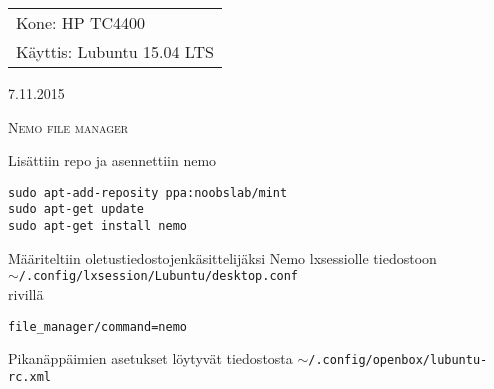 \documentclass[main.tex]{subfiles}
\begin{document}
\thispagestyle{empty}
\begin{tabular}[t]{l}
Kone: HP TC4400\\
Käyttis: Lubuntu 15.04 LTS
\end{tabular}
\hfill 7.11.2015

{\scshape\Large{Nemo file manager}}

Lisättiin repo ja asennettiin nemo

\begin{lstlisting}
sudo apt-add-reposity ppa:noobslab/mint
sudo apt-get update
sudo apt-get install nemo
\end{lstlisting}

Määriteltiin oletustiedostojenkäsittelijäksi Nemo lxsessiolle tiedostoon \\
\texttt{$\sim$/.config/lxsession/Lubuntu/desktop.conf} \\
rivillä 

\begin{lstlisting}
file_manager/command=nemo
\end{lstlisting}

Pikanäppäimien asetukset löytyvät tiedostosta \texttt{$\sim$/.config/openbox/lubuntu-rc.xml}
\end{document}
